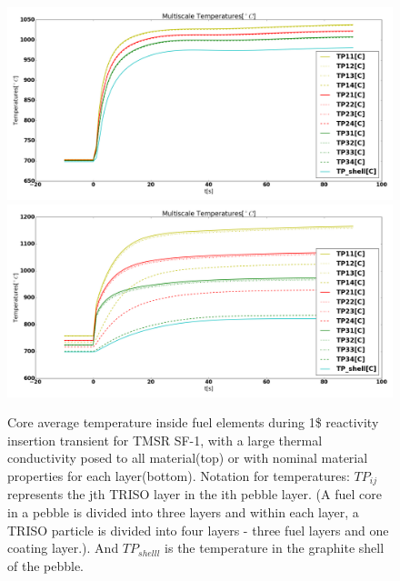 \documentclass{elsarticle}
\begin{document}
\begin{figure}
    \centering
    \includegraphics[width=\textwidth]{images/diffusion/tmsr/RI/compare_multiscale/temps_large_k.png}
    \includegraphics[width=\textwidth]{images/diffusion/tmsr/RI/compare_multiscale/temps_nominal_k.png}
    \caption{Core average temperature inside fuel elements during 1\$ reactivity insertion transient for TMSR SF-1, with a large thermal conductivity posed to all material(top) or with nominal material properties for each layer(bottom). Notation for temperatures: $TP_{ij}$ represents the jth TRISO layer in the ith pebble layer. (A fuel core in a pebble is divided into three layers and within each layer, a TRISO particle is divided into four layers - three fuel layers and one coating layer.). And $TP_{shelll}$ is the temperature in the graphite shell of the pebble.} 
    \label{fig:temps_TMSR}
\end{figure}

 

\end{document}
